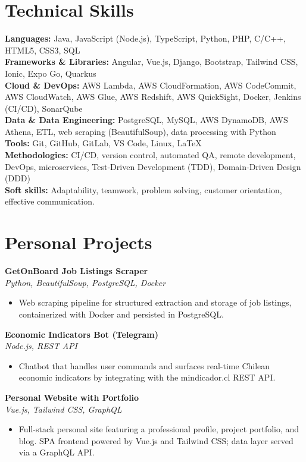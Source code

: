 \documentclass[11pt,a4paper]{article}
\newcommand{\proj}[2]{%
    \textbf{#1} \\
    \textit{#2}\\[2pt]
}
\begin{document}
\section*{Technical Skills}
\textbf{Languages:} Java, JavaScript (Node.js), TypeScript, Python, PHP, C/C++, HTML5, CSS3, SQL\\
\textbf{Frameworks \& Libraries:} Angular, Vue.js, Django, Bootstrap, Tailwind CSS, Ionic, Expo Go, Quarkus\\
\textbf{Cloud \& DevOps:} AWS Lambda, AWS CloudFormation, AWS CodeCommit, AWS CloudWatch, AWS Glue, AWS Redshift, AWS QuickSight, Docker, Jenkins (CI/CD), SonarQube\\
\textbf{Data \& Data Engineering:} PostgreSQL, MySQL, AWS DynamoDB, AWS Athena, ETL, web scraping (BeautifulSoup), data processing with Python\\
\textbf{Tools:} Git, GitHub, GitLab, VS Code, Linux, \LaTeX\\
\textbf{Methodologies:} CI/CD, version control, automated QA, remote development, DevOps, microservices, Test-Driven Development (TDD), Domain-Driven Design (DDD)\\
\textbf{Soft skills:} Adaptability, teamwork, problem solving, customer orientation, effective communication.

\section*{Personal Projects}

\proj{GetOnBoard Job Listings Scraper}{Python, BeautifulSoup, PostgreSQL, Docker}
\begin{itemize}[leftmargin=*, itemsep=1pt, topsep=2pt]
    \item Web scraping pipeline for structured extraction and storage of job listings, containerized with Docker and persisted in PostgreSQL.
\end{itemize}

\proj{Economic Indicators Bot (Telegram)}{Node.js, REST API}
\begin{itemize}[leftmargin=*, itemsep=1pt, topsep=2pt]
    \item Chatbot that handles user commands and surfaces real-time Chilean economic indicators by integrating with the mindicador.cl REST API.
\end{itemize}

\proj{Personal Website with Portfolio}{Vue.js, Tailwind CSS, GraphQL}
\begin{itemize}[leftmargin=*, itemsep=1pt, topsep=2pt]
    \item Full-stack personal site featuring a professional profile, project portfolio, and blog. SPA frontend powered by Vue.js and Tailwind CSS; data layer served via a GraphQL API.
\end{itemize}
\end{document}
